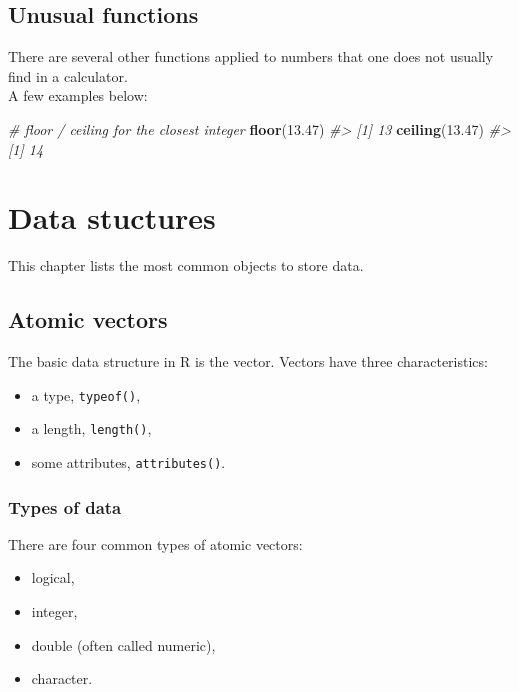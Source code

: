 \documentclass[]{book}
\newenvironment{Shaded}{}{}
\newcommand{\CommentTok}[1]{\textcolor[rgb]{0.38,0.63,0.69}{\textit{#1}}}
\newcommand{\FloatTok}[1]{\textcolor[rgb]{0.25,0.63,0.44}{#1}}
\newcommand{\KeywordTok}[1]{\textcolor[rgb]{0.00,0.44,0.13}{\textbf{#1}}}
\newcommand{\NormalTok}[1]{#1}
\providecommand{\tightlist}{%
  \setlength{\itemsep}{0pt}\setlength{\parskip}{0pt}}
\theoremstyle{definition}
\theoremstyle{definition}
\theoremstyle{definition}
\theoremstyle{remark}
\begin{document}
\hypertarget{unusual-functions}{%
\section{Unusual functions}\label{unusual-functions}}

There are several other functions applied to numbers that one does not
usually find in a calculator.\\
A few examples below:

\begin{Shaded}
\begin{Highlighting}[]
\CommentTok{# floor / ceiling for the closest integer}
\KeywordTok{floor}\NormalTok{(}\FloatTok{13.47}\NormalTok{)}
\CommentTok{#> [1] 13}
\KeywordTok{ceiling}\NormalTok{(}\FloatTok{13.47}\NormalTok{)}
\CommentTok{#> [1] 14}
\end{Highlighting}
\end{Shaded}

\hypertarget{datastructures}{%
\chapter{Data stuctures}\label{datastructures}}

This chapter lists the most common objects to store data.

\hypertarget{atomic-vectors}{%
\section{Atomic vectors}\label{atomic-vectors}}

The basic data structure in R is the vector. Vectors have three
characteristics:

\begin{itemize}
\tightlist
\item
  a type, \texttt{typeof()},
\item
  a length, \texttt{length()},
\item
  some attributes, \texttt{attributes()}.
\end{itemize}

\hypertarget{types-of-data}{%
\subsection{Types of data}\label{types-of-data}}

There are four common types of atomic vectors:

\begin{itemize}
\tightlist
\item
  logical,
\item
  integer,
\item
  double (often called numeric),
\item
  character.
\end{itemize}
\end{document}
